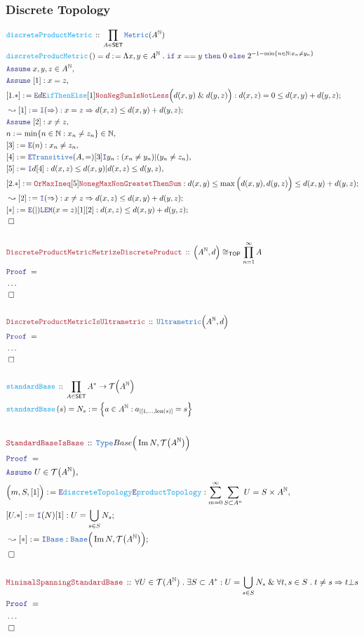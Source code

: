 \documentclass[12pt]{scrartcl}
\newcommand{\TYPE}[1]{\textcolor{NavyBlue}{\mathtt{#1}}}
\newcommand{\FUNC}[1]{\textcolor{Cerulean}{\mathtt{#1}}}
\newcommand{\LOGIC}[1]{\textcolor{Blue}{\mathtt{#1}}}
\newcommand{\THM}[1]{\textcolor{Maroon}{\mathtt{#1}}}
\renewcommand{\.}{\; . \;}
\newcommand{\de}{: \kern 0.1pc =}
\newcommand{\If}{\LOGIC{if} \;}
\newcommand{\Then}{ \; \LOGIC{then} \;}
\newcommand{\Else}{\; \LOGIC{else} \;}
\newcommand{\Act}[1]{\left( #1 \right)}
\newcommand{\Theorem}[2]{& \THM{#1} \, :: \, #2 \\ & \Proof = \\ }
\newcommand{\DeclareFunc}[2]{& \FUNC{#1} \, :: \, #2 \\}
\newcommand{\DefineNamedFunc}[4]{&  \FUNC{#1}\Act{#2} = #3 \de #4 \\}
\newcommand{\Page}[1]{ \begin{align*} #1 \end{align*}   }
\newcommand{\NoProof}{ & \ldots \\ \EndProof}
\renewcommand{\And}{\; \& \;}
\newcommand{\Imply}{\Rightarrow}
\newcommand{\Intro}{\LOGIC{I}}
\newcommand{\Elim}{\LOGIC{E}}
\newcommand{\Type}{\TYPE{Type}}
\newcommand{\Nat}{\mathbb{N} }
\DeclareMathOperator*{\im}{Im}
\newcommand{\Say}[3]{& #1 \de #2 : #3, \\}
\newcommand{\SayIn}[3]{& #1 \de #2 \in #3, \\}
\newcommand{\Conclude}[3]{& #1 \de #2 : #3; \\}
\newcommand{\DeriveConclude}[3]{& \leadsto #1 \de #2 : #3 ; \\}
\newcommand{\Assume}[2]{& \LOGIC{Assume} \; #1 : #2, \\}
\newcommand{\AssumeIn}[2]{& \LOGIC{Assume} \; #1 \in #2, \\}
\newcommand{\QED}{\; \square}
\newcommand{\EndProof}{& \QED \\}
\newcommand{\Proof}{\LOGIC{Proof} \; }
\newcommand{\SET}{\mathsf{SET}}
\newcommand{\TOP}{\mathsf{TOP}}
\newcommand{\T}{\mathcal{T}}
\newcommand{\FS}[1]{{#1}{}^*}
\DeclareMathOperator{\len}{len}
\newcommand{\inits}[2]{{#1}_{|\left[1,\ldots,#2\right]}}
\begin{document}
\subsubsection{Discrete Topology}
\Page{
	\DeclareFunc{discreteProductMetric}{\prod_{A \in \SET} \TYPE{Metric}(A^\Nat)}
	\DefineNamedFunc{discreteProducMetric}{}{d}
	{
		\Lambda x,y \in A^\Nat \. 
		\If x == y \Then 0 \Else  
		2^{ -1  - \min\{ n \in \Nat : x_n \neq y_n  \}  } 
	}
	\AssumeIn{x,y,z}{A^\Nat}
	\Assume{[1]}{x = z}
	\Conclude{[1.*]}{\Elim d \Elim \FUNC{ifThenElse}[1] \THM{NonNegSumIsNotLess}\Big(d(x,y)\And d(y,z)\Big)}
	{
		d(x,z) = 0 \le d(x,y) + d(y,z)
	}
	\DeriveConclude{[1]}{\Intro(\Imply)}
	{
		x=z \Imply d(x,z)  \le d(x,y) + d(y,z)
	}
	\Assume{[2]}{x \neq z}
	\SayIn{n}{ \min\{ n \in \Nat : x_n \neq z_n \}}
	{
		\Nat
	}
	\Say{[3]}{\Elim (n)}{x_n \neq z_n}
	\Say{[4]}{\Elim \TYPE{Transitive}(A,=)[3]\Intro y_n}
	{
		(x_n \neq y_n) | (y_n \neq z_n)
	}
	\Say{[5]}{\Intro d [4]}{ d(x,z) \le d(x,y) | d(x,z) \le d(y,z) }
	\Conclude{[2.*]}{ \THM{OrMaxIneq}[5] \THM{NonegMaxNonGreatetThenSum}  }
	{
		d(x,y) \le \max\Big(d(x,y),d(y,z)\Big) \le d(x,y) + d(y,z)
	}
	\DeriveConclude{[2]}{\Intro(\Imply)}
	{
		x \neq z \Imply d(x,z)  \le d(x,y) + d(y,z)
	}
	\Conclude{[*]}{\Elim(|)\LOGIC{LEM}(x=z)[1][2]}{ d(x,z) \le d(x,y) + d(y,z)  }
	\EndProof
	\\
	\Theorem{DiscreteProductMetricMetrizeDiscreteProduct}
	{
		\Big(A^\Nat, d\Big)
		\cong_\TOP  \prod^\infty_{n=1} A 
	}
	\NoProof
	\\
	\Theorem{DiscreteProductMetricIsUltrametric}
	{
		\TYPE{Ultrametric}\Big(A^\Nat,d\Big)
	}
	\NoProof
	\\
	\DeclareFunc{standardBase}{\prod_{A \in \SET} \FS{A} \to \T\Big(A^\Nat\Big)}
	\DefineNamedFunc{standardBase}{s}{N_s}{ \Big\{ a \in A^\Nat : \inits{a}{\len(s)} = s \Big\} }
	\\
}\Page{
	\Theorem{StandardBaseIsBase}
	{
		\Type{Base}\Big( \im N, \T\big( A^\Nat\big)  \Big)
	}
	\AssumeIn{U}{\T\big( A^\Nat \big)}
	\Say{\Big(m,S,[1]\Big)}
	{
		\Elim \FUNC{discreteTopology} \Elim \FUNC{productTopology}
	}
	{
		\sum^\infty_{m=0} \sum_{S \subset A^n}  U = S \times A^\Nat
	}
	\Conclude{[U.*]}{\Intro(N)[1]}{ U = \bigcup_{s \in S} N_s}
	\DeriveConclude{[*]}{\Intro \TYPE{Base}}{\TYPE{Base}\Big( \im N, \T\big( A^\Nat \big) \Big)}
	\EndProof
	\\
	\Theorem{MinimalSpanningStandardBase}
	{
		\forall U \in \T(A^\Nat) \.
		\exists S \subset \FS{A} : 
		U = \bigcup_{s \in S} N_s \And
		\forall t,s \in S \. t \neq s \Imply t \bot s
	}
	\NoProof
	\\
}
\end{document}
